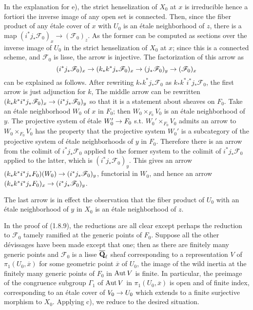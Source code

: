 \documentclass[deligne.tex]{subfiles}
\begin{document}
In the explanation for e), the strict henselization of $X_0$ at $x$ is
irreducible hence a fortiori the inverse image of any open set is connected.
Then, since the fiber product of any étale cover of $x$ with $U_0$ is an
étale neighborhood of $z$, there is a map
$(i^\ast j_\ast\mathscr F_0)_x\rightarrow(\mathscr F_0)_z$.
As the former can be computed as sections over the inverse image of $U_0$ in
the strict henselization of $X_0$ at $x$; since this is a connected scheme, 
and $\mathscr F_0$ is lisse, the arrow is injective.
The factorization of this arrow as
\begin{equation*}
	(i^\ast j_\ast\mathscr F_0)_x\rightarrow(k_\ast k^\ast j_\ast\mathscr F_0)_x
	\rightarrow(j_\ast\mathscr F_0)_y\rightarrow(\mathscr F_0)_x
\end{equation*}
can be explained as follows. After rewriting
$k_\ast k^\ast j_\ast\mathscr F_0$ as
$k_\ast k^\ast i^\ast j_\ast\mathscr F_0$, the first arrow is just 
adjunction for $k$, 
The middle arrow can be rewritten
$(k_\ast k^\ast i^\ast j_\ast\mathscr F_0)_x\rightarrow(i^\ast j_\ast\mathscr F_0)_y$ so that it is a statement about sheaves on $F_0$.
Take an étale neighborhood $W_0$ of $x$ in $F_0$; then $W_0\times_{F_0}V_0$
is an étale neighborhood of $y$.
The projective system of étale $W_0'\rightarrow F_0$ s.t. $W_0'\times_{F_0}V_0$
admits an arrow to $W_0\times_{F_0}V_0$ has the property that the projective
system $W_0'$ is a subcategory of the projective system of
étale neighborhoods of $y$ in $F_0$. Therefore there is an arrow from the 
colimit of $i^\ast j_\ast\mathscr F_0$ applied to the former system
to the colimit of $i^\ast j_\ast\mathscr F_0$ applied to the latter,
which is $(i^\ast j_\ast\mathscr F_0)_y$. This gives an arrow
$(k_\ast k^\ast i^\ast j_\ast F_0)(W_0)\rightarrow (i^\ast j_\ast\mathscr F_0)_y$,
functorial in $W_0$, and hence an arrow
$(k_\ast k^\ast i^\ast j_\ast F_0)_x\rightarrow (i^\ast j_\ast\mathscr F_0)_y$.

The last arrow is in effect the observation that the fiber product of
$U_0$ with an étale neighborhood of $y$ in $X_0$ is an étale neighborhood
of $z$.

In the proof of (1.8.9), the reductions are all clear except perhaps the
reduction to $\mathscr F_0$ tamely ramified at the generic points of $F_0$.
Suppose all the other dévissages have been made except that one; then as
there are finitely many generic points and $\mathscr F_0$ is a lisse
$\overline{\mathbf{Q}}_\ell$ sheaf corresponding to a representation $V$ of
$\pi_1(U_0,\overline x)$ for some geometric point $\overline x$ of $U_0$, 
the image of the wild inertia at the finitely many generic points of $F_0$ 
in $\operatorname{Aut} V$ is finite. In particular, the preimage of the congruence
subgroup $\Gamma_1$ of $\operatorname{Aut} V$ in $\pi_1(U_0,\overline x)$ is open and of
finite index, corresponding to an étale cover of $V_0\rightarrow U_0$ which extends
to a finite surjective morphism to $X_0$. Applying c), we reduce to the
desired situation.
\end{document}
